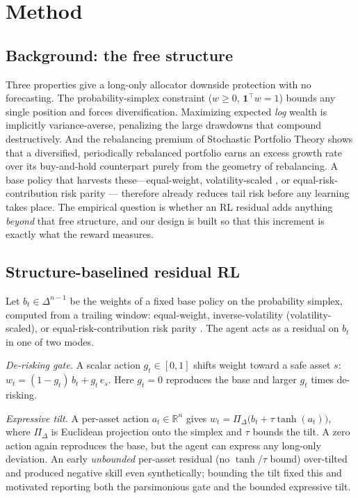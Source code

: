 \documentclass[sigconf,anonymous,review]{acmart}
\begin{document}
\section{Method}

\subsection{Background: the free structure}
Three properties give a long-only allocator downside protection with no forecasting.
The probability-simplex constraint ($w\ge 0$, $\mathbf{1}^\top w = 1$) bounds any
single position and forces diversification. Maximizing expected \emph{log} wealth is
implicitly variance-averse, penalizing the large drawdowns that compound
destructively. And the rebalancing premium of Stochastic Portfolio Theory
\cite{fernholz2002} shows that a diversified, periodically rebalanced portfolio earns
an excess growth rate over its buy-and-hold counterpart purely from the geometry of
rebalancing. A base policy that harvests these---equal-weight, volatility-scaled
\cite{moreira2017}, or equal-risk-contribution risk parity \cite{maillard2010}---
therefore already reduces tail risk before any learning takes place. The empirical
question is whether an RL residual adds anything \emph{beyond} that free structure,
and our design is built so that this increment is exactly what the reward measures.

\subsection{Structure-baselined residual RL}
Let $b_t \in \Delta^{n-1}$ be the weights of a fixed base policy on the probability
simplex, computed from a trailing window: equal-weight, inverse-volatility
(volatility-scaled), or equal-risk-contribution risk parity \cite{maillard2010}. The
agent acts as a residual on $b_t$ in one of two modes.

\emph{De-risking gate.} A scalar action $g_t \in [0,1]$ shifts weight toward a safe
asset $s$: $w_t = (1-g_t)\,b_t + g_t\,e_s$. Here $g_t=0$ reproduces the base and
larger $g_t$ times de-risking.

\emph{Expressive tilt.} A per-asset action $a_t \in \mathbb{R}^n$ gives
$w_t = \Pi_{\Delta}\big(b_t + \tau\tanh(a_t)\big)$, where $\Pi_\Delta$ is Euclidean
projection onto the simplex \cite{duchi2008} and $\tau$ bounds the tilt. A zero
action again reproduces the base, but the agent can express any long-only deviation.
An early \emph{unbounded} per-asset residual (no $\tanh$/$\tau$ bound) over-tilted
and produced negative skill even synthetically; bounding the tilt fixed this and
motivated reporting both the parsimonious gate and the bounded expressive tilt.
\end{document}
